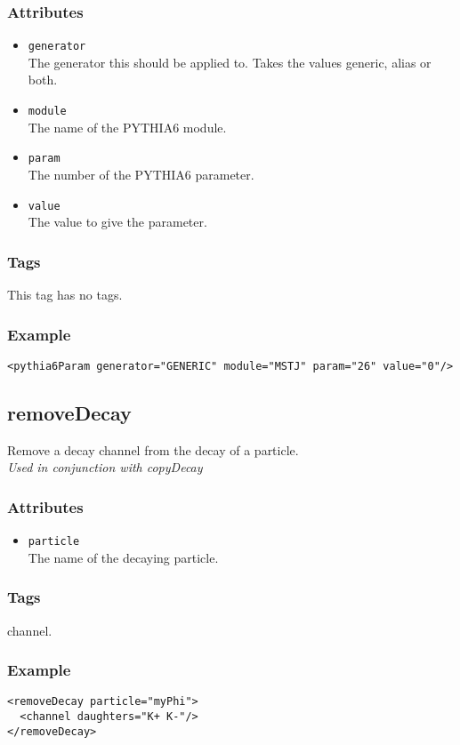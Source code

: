 \subsubsection*{Attributes}
\begin{itemize}
\item{\tt generator}\\
      The generator this should be applied to. Takes the values generic, alias or both.
\item{\tt module}\\
      The name of the PYTHIA6 module.
\item{\tt param}\\
      The number of the PYTHIA6 parameter.
\item{\tt value}\\
      The value to give the parameter.
\end{itemize}
\subsubsection*{Tags}
This tag has no tags.
\subsubsection*{Example}
{\footnotesize
\begin{verbatim}
<pythia6Param generator="GENERIC" module="MSTJ" param="26" value="0"/>
\end{verbatim}
}

\subsection{removeDecay}
Remove a decay channel from the decay of a particle.\\
\emph{Used in conjunction with copyDecay}
\subsubsection*{Attributes}
\begin{itemize}
\item{\tt particle}\\
      The name of the decaying particle.
\end{itemize}
\subsubsection*{Tags}
channel.
\subsubsection*{Example}
{\footnotesize
\begin{verbatim}
<removeDecay particle="myPhi">
  <channel daughters="K+ K-"/>
</removeDecay>
\end{verbatim}
}

